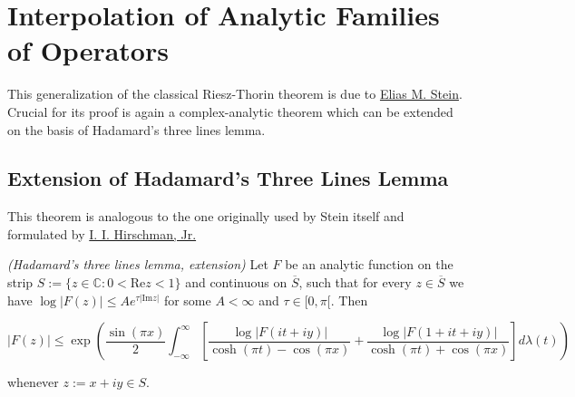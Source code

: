 \section{Interpolation of Analytic Families of Operators}
This generalization of the classical Riesz-Thorin theorem is due to \href{http://www.ams.org/journals/tran/1956-083-02/S0002-9947-1956-0082586-0/S0002-9947-1956-0082586-0.pdf}{Elias M. Stein}. Crucial for its proof is again a complex-analytic theorem which can be extended on the basis of Hadamard's three lines lemma.

\subsection{Extension of Hadamard's Three Lines Lemma}
This theorem is analogous to the one originally used by Stein itself and formulated by \href{http://download.springer.com/static/pdf/285/art\%253A10.1007\%252FBF02825637.pdf?originUrl=http\%3A\%2F\%2Flink.springer.com\%2Farticle\%2F10.1007\%2FBF02825637\&token2=exp=1470939579~acl=\%2Fstatic\%2Fpdf\%2F285\%2Fart\%25253A10.1007\%25252FBF02825637.pdf\%3ForiginUrl\%3Dhttp\%253A\%252F\%252Flink.springer.com\%252Farticle\%252F10.1007\%252FBF02825637*~hmac=d88bfe05b2cc8b0deed0f4781b8dfdd3701969606a6033727bfaf0c034cbd876}{ I. I. Hirschman, Jr.}

\vspace{2mm}

\begin{mdframed}
	\begin{lemma}\emph{(Hadamard's three lines lemma, extension)}
		Let $F$ be an analytic function on the strip $S := \{z \in \mathbb{C}: 0 < \mathrm{Re}z < 1\}$ and continuous on $\overline{S}$, such that for every $z \in \overline{S}$ we have $\log \vert F(z)\vert \leqslant A e^{\tau \vert \mathrm{Im}z \vert}$ for some $A < \infty$ and $\tau \in [0,\pi[$. Then

			\begin{equation*}
				\vert F(z) \vert \leqslant \exp\left( \frac{\sin(\pi x)}{2} \int_{-\infty}^\infty \left[ \frac{\log \vert F(it + iy)\vert}{\cosh(\pi t) - \cos(\pi x)} + \frac{\log \vert F(1 + it + iy)\vert}{\cosh(\pi t) + \cos(\pi x)} \right] d\lambda(t)\right)
			\end{equation*}

			whenever $z := x + iy \in S$.
	\end{lemma}
\end{mdframed}

